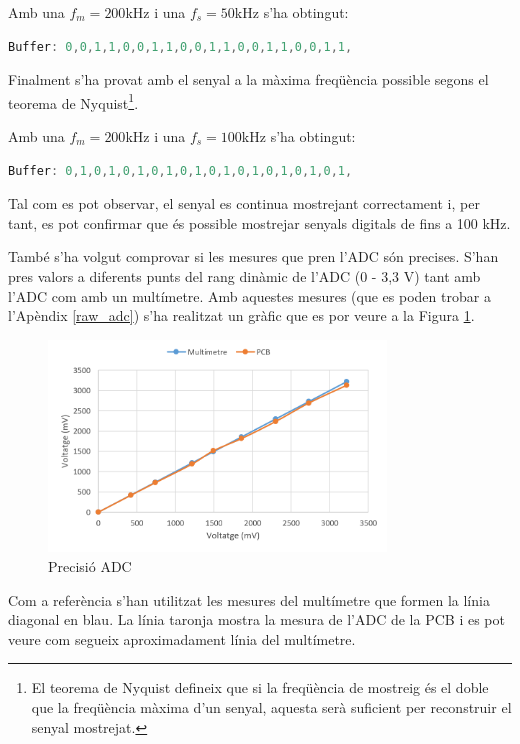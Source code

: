 Amb una $f_{m}=200$kHz i una $f_{s}=50$kHz s'ha obtingut:
\begin{lstlisting}[language=C]
	Buffer: 0,0,1,1,0,0,1,1,0,0,1,1,0,0,1,1,0,0,1,1,
\end{lstlisting}


Finalment s'ha provat amb el senyal a la màxima freqüència possible segons el teorema de Nyquist\footnote{El teorema de Nyquist defineix que si la freqüència de mostreig és el doble que la freqüència màxima d'un senyal, aquesta serà suficient per reconstruir el senyal mostrejat.}.

Amb una $f_{m}=200$kHz i una $f_{s}=100$kHz s'ha obtingut:
\begin{lstlisting}[language=C]
	Buffer: 0,1,0,1,0,1,0,1,0,1,0,1,0,1,0,1,0,1,0,1,
\end{lstlisting}

Tal com es pot observar, el senyal es continua mostrejant correctament i, per tant, es pot confirmar que és possible mostrejar senyals digitals de fins a 100 kHz.


També s'ha volgut comprovar si les mesures que pren l'ADC són precises.
S'han pres valors a diferents punts del rang dinàmic de l'ADC (0 - 3,3 V) tant amb l'ADC com amb un multímetre.
Amb aquestes mesures (que es poden trobar a l'Apèndix \ref{raw_adc}) s'ha realitzat un gràfic que es por veure a la Figura \ref{multimetre}.

\begin{figure}[!h]
	\begin{center}
		\includegraphics[width=0.8\textwidth]{./images/multimetre.PNG}
		\caption{Precisió ADC}
		\label{multimetre}
	\end{center}
\end{figure}

Com a referència s'han utilitzat les mesures del multímetre que formen la línia diagonal en blau.
La línia taronja mostra la mesura de l'ADC de la PCB i es pot veure com segueix aproximadament línia del multímetre.



